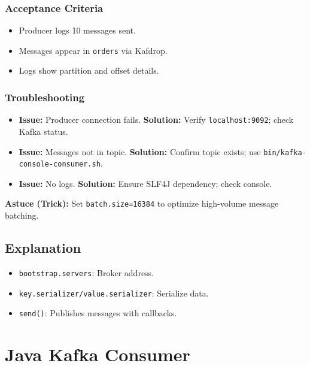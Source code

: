\documentclass[12pt,a4paper]{report}
\begin{document}
\subsection{Acceptance Criteria}
\begin{itemize}
    \item Producer logs 10 messages sent.
    \item Messages appear in \texttt{orders} via Kafdrop.
    \item Logs show partition and offset details.
\end{itemize}

\subsection{Troubleshooting}
\begin{itemize}
    \item \textbf{Issue:} Producer connection fails.
      \textbf{Solution:} Verify \texttt{localhost:9092}; check Kafka status.
    \item \textbf{Issue:} Messages not in topic.
      \textbf{Solution:} Confirm topic exists; use \texttt{bin/kafka-console-consumer.sh}.
    \item \textbf{Issue:} No logs.
      \textbf{Solution:} Ensure SLF4J dependency; check console.
\end{itemize}

\begin{framed}
\textbf{Astuce (Trick):} Set \texttt{batch.size=16384} to optimize high-volume message batching.
\end{framed}

\section{Explanation}
\begin{itemize}
    \item \texttt{bootstrap.servers}: Broker address.
    \item \texttt{key.serializer/value.serializer}: Serialize data.
    \item \texttt{send()}: Publishes messages with callbacks.
\end{itemize}

\chapter{Java Kafka Consumer}
\end{document}

